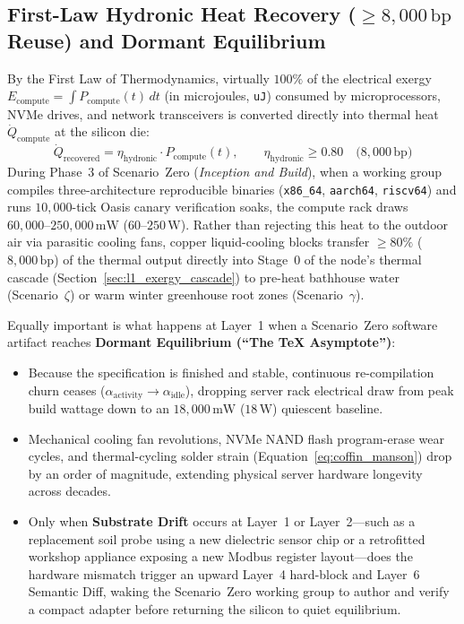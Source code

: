\subsection{First-Law Hydronic Heat Recovery ($\ge 8{,}000\,\mathrm{bp}$ Reuse) and Dormant Equilibrium}

By the First Law of Thermodynamics, virtually $100\%$ of the electrical exergy $E_{\mathrm{compute}} = \int P_{\mathrm{compute}}(t)\,dt$ (in microjoules, \texttt{uJ}) consumed by microprocessors, NVMe drives, and network transceivers is converted directly into thermal heat $\dot{Q}_{\mathrm{compute}}$ at the silicon die:
\begin{equation}
\dot{Q}_{\mathrm{recovered}} = \eta_{\mathrm{hydronic}} \cdot P_{\mathrm{compute}}(t), \qquad \eta_{\mathrm{hydronic}} \ge 0.80 \quad \bigl(8{,}000\,\mathrm{bp}\bigr)
\label{eq:l1_compute_heat_recovery}
\end{equation}
During Phase~3 of Scenario~Zero (\textit{Inception and Build}), when a working group compiles three-architecture reproducible binaries (\texttt{x86\_64}, \texttt{aarch64}, \texttt{riscv64}) and runs $10{,}000$-tick Oasis canary verification soaks, the compute rack draws $60{,}000\text{--}250{,}000\,\mathrm{mW}$ ($60\text{--}250\,\mathrm{W}$). Rather than rejecting this heat to the outdoor air via parasitic cooling fans, copper liquid-cooling blocks transfer $\ge 80\%$ ($8{,}000\,\mathrm{bp}$) of the thermal output directly into Stage~0 of the node's thermal cascade (Section~\ref{sec:l1_exergy_cascade}) to pre-heat bathhouse water (Scenario~$\zeta$) or warm winter greenhouse root zones (Scenario~$\gamma$).

Equally important is what happens at Layer~1 when a Scenario~Zero software artifact reaches \textbf{Dormant Equilibrium (``The \TeX{} Asymptote'')}:
\begin{itemize}
    \item Because the specification is finished and stable, continuous re-compilation churn ceases ($\alpha_{\mathrm{activity}} \to \alpha_{\mathrm{idle}}$), dropping server rack electrical draw from peak build wattage down to an $18{,}000\,\mathrm{mW}$ ($18\,\mathrm{W}$) quiescent baseline.
    \item Mechanical cooling fan revolutions, NVMe NAND flash program-erase wear cycles, and thermal-cycling solder strain (Equation~\ref{eq:coffin_manson}) drop by an order of magnitude, extending physical server hardware longevity across decades.
    \item Only when \textbf{Substrate Drift} occurs at Layer~1 or Layer~2---such as a replacement soil probe using a new dielectric sensor chip or a retrofitted workshop appliance exposing a new Modbus register layout---does the hardware mismatch trigger an upward Layer~4 hard-block and Layer~6 Semantic Diff, waking the Scenario~Zero working group to author and verify a compact adapter before returning the silicon to quiet equilibrium.
\end{itemize}

